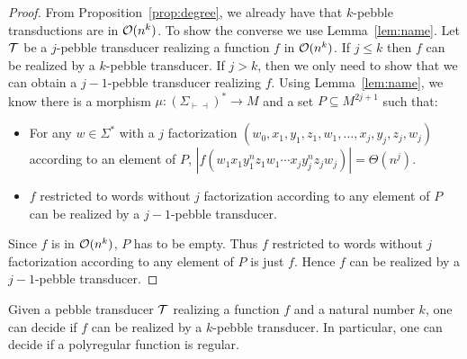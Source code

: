 \begin{proof}
    From Proposition~\ref{prop:degree}, we already have that $k$-pebble transductions are in ${\mathcal O}(n^k)$.
    To show the converse we use Lemma~\ref{lem:name}.
    Let ${\mathcal T}$ be a $j$-pebble transducer realizing a function $f$ in ${\mathcal O}(n^k)$.
    If $j\leq k$ then $f$ can be realized by a $k$-pebble transducer. If $j>k$, then we only need to show that we can obtain a $j-1$-pebble transducer realizing $f$. Using Lemma~\ref{lem:name}, we know there is a morphism $\mu:(\Sigma_{\vdash\dashv})^*\rightarrow M$ and a set $P\subseteq M^{2j+1}$ such that:
    \begin{itemize}
    \item For any $w\in \Sigma^*$ with a $j$ factorization 
    $(w_0,x_{1},y_1,z_1,w_1,\ldots,x_j,y_j,z_j, w_j)$ according to an element of $P$, $|f(w_1x_1y_{1}^nz_1w_1\cdots x_jy_j^nz_jw_j)|=\Theta(n^j)$.
    \item $f$ restricted to words without $j$ factorization according to any element of $P$ can be realized by a $j{-}1$-pebble transducer.
    \end{itemize}
    Since $f$ is in ${\mathcal O}(n^k)$, $P$ has to be empty. Thus $f$ restricted to words without $j$ factorization according to any element of $P$ is just $f$. Hence $f$ can be realized by a $j-1$-pebble transducer.

\end{proof}



\begin{theorem}
    Given a pebble transducer ${\mathcal T}$ realizing a function $f$ and a natural number $k$, one can decide if $f$ can be realized by a $k$-pebble transducer. In particular, one can decide if a polyregular function is regular.
\end{theorem}

